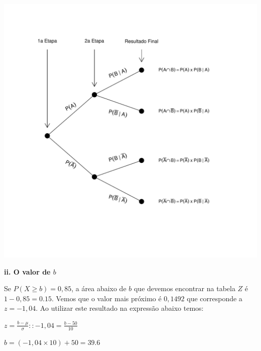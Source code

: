 \documentclass[
]{book}
\begin{document}
\includegraphics{probest-cambientais_files/figure-latex/unnamed-chunk-95-1.pdf}

\textbf{ii. O valor de \(b\)}

Se \(P(X \ge b) = 0,85\), a área abaixo de \(b\) que devemos encontrar na tabela \(Z\) é \(1 - 0,85 = 0.15\). Vemos que o valor mais próximo é \(0,1492\) que corresponde a \(z = -1,04\). Ao utilizar este resultado na expressão abaixo temos:

\(z = \frac{b - \mu}{\sigma} :: -1,04 = \frac{b - 50}{10}\)

\(b = (-1,04 \times 10) + 50 = 39.6\)
\end{document}
